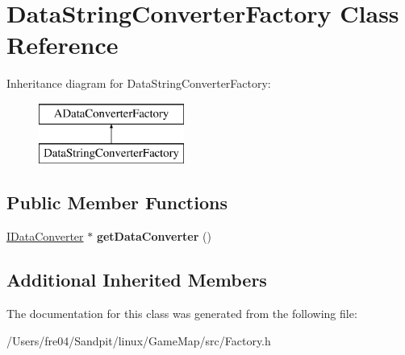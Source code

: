 \hypertarget{class_data_string_converter_factory}{}\section{Data\+String\+Converter\+Factory Class Reference}
\label{class_data_string_converter_factory}
Inheritance diagram for Data\+String\+Converter\+Factory\+:\begin{figure}[H]
\begin{center}
\leavevmode
\includegraphics[height=2.000000cm]{class_data_string_converter_factory}
\end{center}
\end{figure}
\subsection*{Public Member Functions}
\begin{DoxyCompactItemize}
\item 
\hypertarget{class_data_string_converter_factory_ae8df1295326f3d21d40e003fe6ef8f4c}{}\hyperlink{class_i_data_converter}{I\+Data\+Converter} $\ast$ {\bfseries get\+Data\+Converter} ()\label{class_data_string_converter_factory_ae8df1295326f3d21d40e003fe6ef8f4c}

\end{DoxyCompactItemize}
\subsection*{Additional Inherited Members}


The documentation for this class was generated from the following file\+:\begin{DoxyCompactItemize}
\item 
/\+Users/fre04/\+Sandpit/linux/\+Game\+Map/src/Factory.\+h\end{DoxyCompactItemize}
